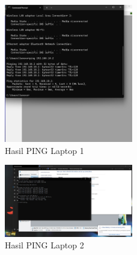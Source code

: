 \begin{figure}[H]
    \centering
    \includegraphics[width=0.5\textwidth]{P1/img/8.jpg}
    \caption{Hasil PING Laptop 1}
    \label{fig:labelgambar}
\end{figure}
\begin{figure}[H]
    \centering
    \includegraphics[width=0.5\textwidth]{P1/img/7.jpg}
    \caption{Hasil PING Laptop 2}
    \label{fig:labelgambar}
\end{figure}
